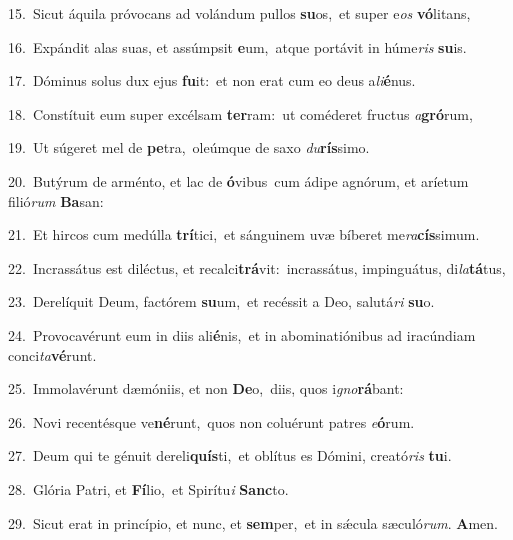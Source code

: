 {\numbfont\textcolor{\numbcolor}{15.}}~Sicut áquila próvocans ad volándum pullos \textbf{su}\-os,~\star et super e\textit{os} \textbf{vó}\-litans,\par
{\numbfont\textcolor{\numbcolor}{16.}}~Expándit alas suas, et assúmpsit \textbf{e}\-um,~\star atque portávit in húme\textit{ris} \textbf{su}\-is.\par
{\numbfont\textcolor{\numbcolor}{17.}}~Dóminus solus dux ejus \textbf{fu}\-it:~\star et non erat cum eo deus a\-\textit{li}\-\textbf{é}nus.\par
{\numbfont\textcolor{\numbcolor}{18.}}~Constítuit eum super excélsam \textbf{ter}\-ram:~\star ut coméderet fructus \textit{a}\-\textbf{gró}rum,\par
{\numbfont\textcolor{\numbcolor}{19.}}~Ut súgeret mel de \textbf{pe}\-tra,~\star oleúmque de saxo \textit{du}\-\textbf{rís}simo.\par
{\numbfont\textcolor{\numbcolor}{20.}}~Butýrum de arménto, et lac de \textbf{ó}\-vibus~\star cum ádipe agnórum, et aríetum filió\textit{rum} \textbf{Ba}\-san:\par
{\numbfont\textcolor{\numbcolor}{21.}}~Et hircos cum medúlla \textbf{trí}\-tici,~\star et sánguinem uvæ bíberet me\-\textit{ra}\-\textbf{cís}simum.\par
{\numbfont\textcolor{\numbcolor}{22.}}~Incrassátus est diléctus, et recalci\-\textbf{trá}\-vit:~\star incrassátus, impinguátus, di\-\textit{la}\-\textbf{tá}tus,\par
{\numbfont\textcolor{\numbcolor}{23.}}~Derelíquit Deum, factórem \textbf{su}\-um,~\star et recéssit a Deo, salutá\textit{ri} \textbf{su}\-o.\par
{\numbfont\textcolor{\numbcolor}{24.}}~Provocavérunt eum in diis ali\-\textbf{é}\-nis,~\star et in abominatiónibus ad iracúndiam conci\-\textit{ta}\-\textbf{vé}runt.\par
{\numbfont\textcolor{\numbcolor}{25.}}~Immolavérunt dæmóniis, et non \textbf{De}\-o,~\star diis, quos i\-\textit{gno}\-\textbf{rá}bant:\par
{\numbfont\textcolor{\numbcolor}{26.}}~Novi recentésque ve\-\textbf{né}\-runt,~\star quos non coluérunt patres \textit{e}\-\textbf{ó}rum.\par
{\numbfont\textcolor{\numbcolor}{27.}}~Deum qui te génuit dereli\-\textbf{quís}\-ti,~\star et oblítus es Dómini, creató\textit{ris} \textbf{tu}\-i.\par
{\numbfont\textcolor{\numbcolor}{28.}}~Glória Patri, et \textbf{Fí}\-lio,~\star et Spirítu\textit{i} \textbf{Sanc}\-to.\par
{\numbfont\textcolor{\numbcolor}{29.}}~Sicut erat in princípio, et nunc, et \textbf{sem}\-per,~\star et in sǽcula sæculó\-\textit{rum}\-. \textbf{A}\-men.\par
